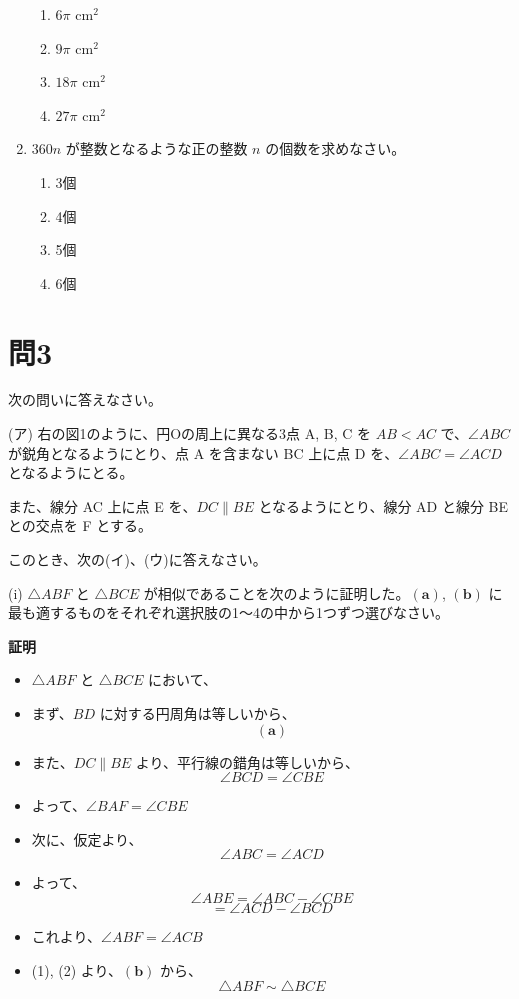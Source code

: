 \documentclass{ltjsarticle}
\begin{document}
\begin{enumerate}
    \begin{enumerate}
        \item $6\pi$ cm$^2$ \quad \item $9\pi$ cm$^2$ \quad \item $18\pi$ cm$^2$ \quad \item $27\pi$ cm$^2$
    \end{enumerate}
    \item $360n$ が整数となるような正の整数 $n$ の個数を求めなさい。
    \begin{enumerate}
        \item 3個 \quad \item 4個 \quad \item 5個 \quad \item 6個
    \end{enumerate}
\end{enumerate}


\section*{問3}
次の問いに答えなさい。

(ア) 右の図1のように、円Oの周上に異なる3点 A, B, C を $AB < AC$ で、$\angle ABC$ が鋭角となるようにとり、点 A を含まない BC 上に点 D を、$\angle ABC = \angle ACD$ となるようにとる。

また、線分 AC 上に点 E を、$DC \parallel BE$ となるようにとり、線分 AD と線分 BE との交点を F とする。

このとき、次の(イ)、(ウ)に答えなさい。

(i) $\triangle ABF$ と $\triangle BCE$ が相似であることを次のように証明した。$\mathbf{(a)}$, $\mathbf{(b)}$ に最も適するものをそれぞれ選択肢の1～4の中から1つずつ選びなさい。

\textbf{証明}
\begin{itemize}
    \item $\triangle ABF$ と $\triangle BCE$ において、
    \item まず、$BD$ に対する円周角は等しいから、
    \[ \mathbf{(a)} \]
    \item また、$DC \parallel BE$ より、平行線の錯角は等しいから、
    \[ \angle BCD = \angle CBE \]
    \item よって、$\angle BAF = \angle CBE$ \quad {}
    \item 次に、仮定より、
    \[ \angle ABC = \angle ACD \]
    \item よって、
    \[ \angle ABE = \angle ABC - \angle CBE \]
    \[ = \angle ACD - \angle BCD \]
    \item これより、$\angle ABF = \angle ACB$ \quad {}
    \item (1), (2) より、$\mathbf{(b)}$ から、
    \[ \triangle ABF \sim \triangle BCE \]
\end{itemize}
\end{document}
